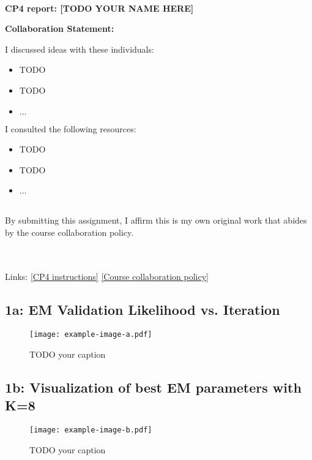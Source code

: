 \documentclass[11pt]{article}
\begin{document}
~~\\ %

{\Large{\bf CP4 report: [TODO YOUR NAME HERE] }}

\Large{\bf Collaboration Statement:}

I discussed ideas with these individuals:
\begin{itemize}
\item TODO
\item TODO
\item $\ldots$  
\end{itemize}

I consulted the following resources:
\begin{itemize}
\item TODO
\item TODO
\item $\ldots$  
\end{itemize}
~~\\
By submitting this assignment, I affirm this is my own original work that abides by the course collaboration policy.

~~\\
~~\\
Links: 
\href{https://www.cs.tufts.edu/cs/136/2024s/cp4.html}{[CP4 instructions]} 
\href{https://www.cs.tufts.edu/cs/136/2024s/index.html#collaboration}{[Course collaboration policy]} 

\setcounter{tocdepth}{2}
\tableofcontents

\newpage

\subsection{1a: EM Validation Likelihood vs. Iteration}

\renewcommand{\figurename}{Fig.}
\renewcommand{\thefigure}{1a}
 \begin{figure}[!h]
     \centering
     \texttt{[image: example-image-a.pdf]}
     \label{fig:1a}
\caption{
TODO your caption
}%
 \end{figure}

\newpage 
\subsection{1b: Visualization of best EM parameters with K=8}

\renewcommand{\figurename}{Fig.}
\renewcommand{\thefigure}{1b}
 \begin{figure}[!h]
     \centering
     \texttt{[image: example-image-b.pdf]}
     \label{fig:1b}
\caption{
TODO your caption
}%
 \end{figure}
\end{document}
